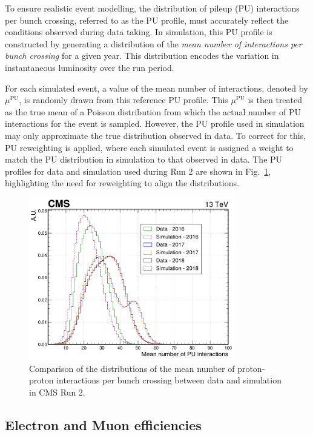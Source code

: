 To ensure realistic event modelling, the distribution of pileup (PU) interactions per bunch crossing, referred to as the PU profile, must accurately reflect the conditions observed during data taking. In simulation, this PU profile is constructed by generating a distribution of the \textit{mean number of interactions per bunch crossing} for a given year. This distribution encodes the variation in instantaneous luminosity over the run period.

For each simulated event, a value of the mean number of interactions, denoted by $\mu^{\text{PU}}$, is randomly drawn from this reference PU profile. This $\mu^{\text{PU}}$ is then treated as the true mean of a Poisson distribution from which the actual number of PU interactions for the event is sampled. However, the PU profile used in simulation may only approximate the true distribution observed in data. To correct for this, PU reweighting is applied, where each simulated event is assigned a weight to match the PU distribution in simulation to that observed in data. The PU profiles for data and simulation used during Run 2 are shown in Fig.~\ref{Figure:Chapter6_PU_Profiles}, highlighting the need for reweighting to align the distributions.

\begin{figure}[h]
\centering
\includegraphics[width=0.8\textwidth]{Figures/Chapter6/PU_Profile.pdf}
\caption{Comparison of the distributions of the mean number of proton-proton interactions per bunch crossing between data and simulation in CMS Run 2.}
\label{Figure:Chapter6_PU_Profiles}
\end{figure}

\subsection{Electron and Muon efficiencies}

